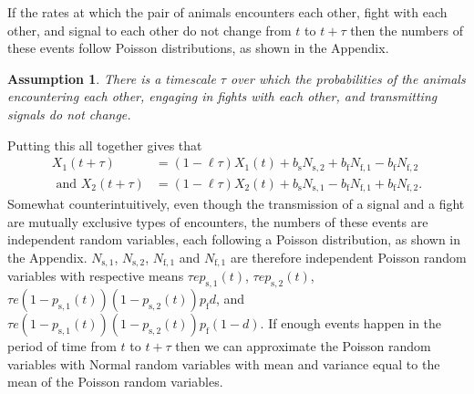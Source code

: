 \documentclass{article}
\newtheorem{ass}{Assumption}
\begin{document}
If the rates at which the pair of animals encounters each other, fight with each other, and signal to each other do not change from $t$ to $t+\tau$ then the numbers of these events follow Poisson distributions, as shown in the Appendix.  
\begin{ass}
There is a timescale $\tau$ over which the probabilities of the animals encountering each other, engaging in fights with each other, and transmitting signals do not change.
\end{ass}

Putting this all together gives that 
\begin{align*}
X_1(t+\tau)&=(1-\ell\tau)X_1(t)+b_{\text{s}}N_{\text{s},2}+b_{\text{f}}N_{\text{f},1}-b_{\text{f}}N_{\text{f},2}
\\ \text{ and } X_2(t+\tau)&=(1-\ell\tau)X_2(t)+b_{\text{s}}N_{\text{s},1}-b_{\text{f}}N_{\text{f},1}+b_{\text{f}}N_{\text{f},2}.
\end{align*}
Somewhat counterintuitively, even though the transmission of a signal and a fight are mutually exclusive types of encounters, the numbers of these events are independent random variables, each following a Poisson distribution, as shown in the Appendix.  $N_{\text{s},1}$, $N_{\text{s},2}$, $N_{\text{f},1}$ and $N_{\text{f},1}$ are therefore independent Poisson random variables with respective means $\tau ep_{\text{s},1}(t)$, $\tau ep_{\text{s},2}(t)$, $\tau e(1-p_{\text{s},1}(t))(1-p_{\text{s},2}(t))p_{\text{f}}d$, and $\tau e(1-p_{\text{s},1}(t))(1-p_{\text{s},2}(t))p_{\text{f}}(1-d)$.  If enough events happen in the period of time from $t$ to $t+\tau$ then we can approximate the Poisson random variables with Normal random variables with mean and variance equal to the mean of the Poisson random variables.
\end{document}
